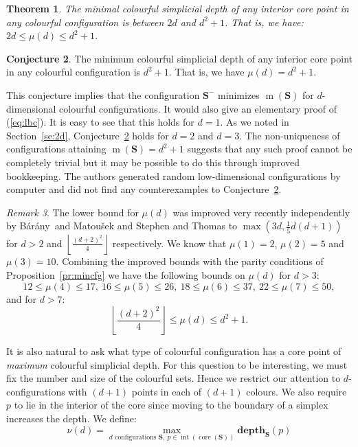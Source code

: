 \documentclass[epsbox,12pt,reqno]{amsart}
\newtheorem{theorem}{Theorem}[section]  %
\theoremstyle{definition}
\newtheorem{conjecture}[theorem]{Conjecture}
\theoremstyle{remark}
\newtheorem{remark}[theorem]{Remark}
\def\csd{\mathbf{depth}}
\def\S{\mathbf{S}}
\def\core{\operatorname{core}}
\def\interior{\operatorname{int}}
\def\bara{B\'ar\'any}
\def\m{\operatorname{m}}
\begin{document}
\begin{theorem}\label{th:bounds}
The minimal colourful simplicial depth of any interior core point in
any colourful configuration is between $2d$ and $d^2+1$.
That is, we have: $2d \le \mu(d) \le d^2+1$.
\end{theorem}

\begin{conjecture}\label{co:mu}
The minimum colourful simplicial depth of any interior core point in any 
colourful configuration is $d^2+1$.  That is, 
we have $\mu(d) = d^2+1$.
\end{conjecture}
This conjecture implies that the configuration $\S^\minus$ 
minimizes $\m(\S)$ for $d$-dimensional colourful 
configurations.  It would also give an elementary proof of (\ref{eq:lbc}).  
It is easy to see that this holds for $d=1$.  As we noted
in Section~\ref{se:2d}, Conjecture~\ref{co:mu} holds for $d=2$ and $d=3$.
The non-uniqueness of configurations attaining $\m(\S)=d^2+1$
suggests that any such proof cannot be completely trivial
but it may be possible to do this through improved bookkeeping.
The authors generated random low-dimensional configurations 
by computer and did not find any counterexamples to 
Conjecture~\ref{co:mu}.

\begin{remark}\label{re:improved}
The lower bound for $\mu(d)$ was improved very recently 
independently by 
\bara~and Matou{\v s}ek \cite{BM06} and 
Stephen and Thomas \cite{ST06} 
to 
$\displaystyle \max\left(3d, \frac{1}{5}d(d+1)\right)$ for $d>2$
and $\displaystyle \left\lfloor \frac{(d+2)^2}{4} \right\rfloor$ 
respectively.  We know that $\mu(1)=2$, $\mu(2)=5$ and $\mu(3)=10$.
Combining the improved bounds with the parity conditions of
Proposition~\ref{pr:mincfg}
we have the following bounds on $\mu(d)$ for $d > 3$: 
$$12 \le \mu(4)\le 17, ~
  16 \le \mu(5) \le 26, ~ 18 \le \mu(6) \le 37, ~ 22 \le \mu(7) \le 50,$$
and for $d > 7$:
$$
\displaystyle \left\lfloor \frac{(d+2)^2}{4} \right\rfloor 
   \le \mu(d) \le d^2+1.$$
\end{remark}
\vspace{1mm}

It is also natural to ask what type of colourful configuration 
has a core point of {\it maximum} colourful simplicial depth.  
For this question to be interesting, we must fix the number and
size of the colourful sets.  Hence we restrict our attention to
$d$-configurations with $(d+1)$ points in each of $(d+1)$ colours.  
We also require $p$
to lie in the interior of the core since moving to the boundary
of a simplex increases the depth.
We define:
\begin{equation}\label{eq:nu}
\nu(d)= \max_{d \text{ configurations }\S, 
  ~ p \in \interior(\core(\S))} \csd_\S(p) 
\end{equation}
\end{document}
